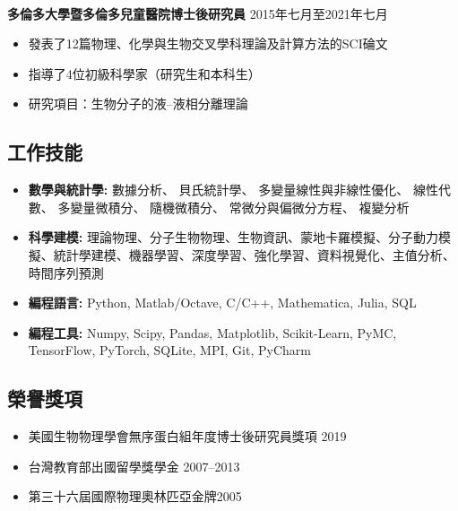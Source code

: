 \documentclass[11pt,letterpaper, sans]{article}
\newcommand{\newsec}[1]{\subsection*{\hspace{-1.5pt}\Large\uppercase{\bf #1}}}
\begin{document}
\begin{flushleft}


\vspace{-1.5em}\ \

{\bf 多倫多大學暨多倫多兒童醫院博士後研究員} \hfill 2015年七月至2021年七月
\vspace{-0.5em}\\
\begin{itemize}[leftmargin=*]\itemsep-0.2em
\item 發表了12篇物理、化學與生物交叉學科理論及計算方法的SCI碖文
\item 指導了4位初級科學家（研究生和本科生）
\item 研究項目：生物分子的液--液相分離理論
\end{itemize}

\newsec{工作技能}
\begin{itemize}[leftmargin=*]\itemsep-0.1em
%
\item {\bf 數學與統計學:}
數據分析、
貝氏統計學、
多變量線性與非線性優化、
線性代數、
多變量微積分、
隨機微積分、
常微分與偏微分方程、
複變分析
\item{\bf 科學建模:}
理論物理、分子生物物理、生物資訊、蒙地卡羅模擬、分子動力模擬、統計學建模、機器學習、深度學習、強化學習、資料視覺化、主值分析、時間序列預測
%
\item{\bf 編程語言:} 
Python, Matlab/Octave, C/C++, Mathematica, Julia, SQL
%
\item{\bf 編程工具:}
Numpy, Scipy, Pandas, Matplotlib, Scikit-Learn, PyMC, TensorFlow, PyTorch, SQLite, MPI, Git, PyCharm
%

\end{itemize}


\newsec{榮譽獎項}
\begin{itemize}[leftmargin=*]\itemsep-0.1em
\item 美國生物物理學會無序蛋白組年度博士後研究員獎項 \hfill 2019 
\item 台灣教育部出國留學獎學金 \hfill 2007--2013 
\item 第三十六屆國際物理奧林匹亞金牌\hfill 2005
\end{itemize}


\end{flushleft}
\end{document}
